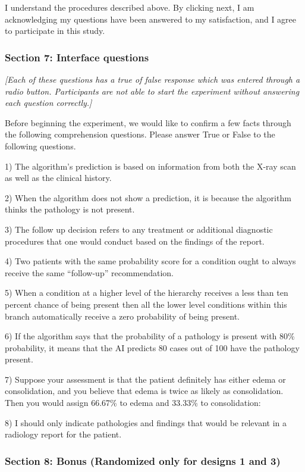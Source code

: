 I understand the procedures described above. By clicking next, I am
acknowledging my questions have been answered to my satisfaction,
and I agree to participate in this study.

\subsubsection*{Section 7: Interface questions}

\emph{{[}Each of these questions has a true of false response which
was entered through a radio button. Participants are not able to start
the experiment without answering each question correctly.{]}}

Before beginning the experiment, we would like to confirm a few facts
through the following comprehension questions. Please answer True
or False to the following questions.

1) The algorithm's prediction is based on information from both the
X-ray scan as well as the clinical history.

2) When the algorithm does not show a prediction, it is because the
algorithm thinks the pathology is not present.

3) The follow up decision refers to any treatment or additional diagnostic
procedures that one would conduct based on the findings of the report.

4) Two patients with the same probability score for a condition ought
to always receive the same \textquotedblleft follow-up\textquotedblright{}
recommendation.

5) When a condition at a higher level of the hierarchy receives a
less than ten percent chance of being present then all the lower level
conditions within this branch automatically receive a zero probability
of being present.

6) If the algorithm says that the probability of a pathology is present
with 80\% probability, it means that the AI predicts 80 cases out
of 100 have the pathology present.

7) Suppose your assessment is that the patient definitely has either
edema or consolidation, and you believe that edema is twice as likely
as consolidation. Then you would assign 66.67\% to edema and 33.33\%
to consolidation:

8) I should only indicate pathologies and findings that would be relevant
in a radiology report for the patient.

\subsubsection*{Section 8: Bonus (Randomized only for designs 1 and 3)}

